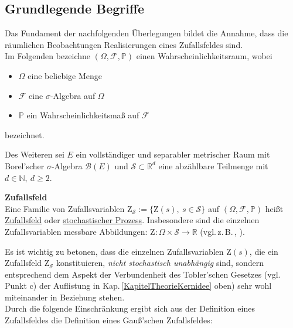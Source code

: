 \subsection{Grundlegende Begriffe}
\label{KapitelTheorieGrundlagen}
Das Fundament der nachfolgenden Überlegungen bildet die 
Annahme, dass die räumlichen Beobachtungen Realisierungen 
eines Zufallsfeldes sind.\\
Im Folgenden bezeichne $(\Omega, \mathcal{F}, \mathbb{P})$ einen Wahrscheinlichkeitsraum, wobei
\begin{itemize}[topsep=2pt,parsep=1pt,itemsep=0.5pt]
\item[$\circ$] $\Omega$ eine beliebige Menge 
\item[$\circ$] $\mathcal{F}$ eine $\sigma$-Algebra auf $\Omega$
\item[$\circ$] $\mathbb{P}$ ein Wahrscheinlichkeitsmaß 
auf $\mathcal{F}$
\end{itemize}
bezeichnet.

Des Weiteren sei $E$ ein vollständiger und separabler metrischer Raum
mit Borel'scher $\sigma$-Algebra $\mathcal{B}(E)$ und 
$\mathcal{S} \subset \mathbb{R}^d$ eine abzählbare Teilmenge 
mit $d \in\mathbb{N},\ d \geq 2$.

\begin{definition} \textbf{Zufallsfeld} \\
Eine Familie von Zufallsvariablen 
$\mathrm{Z}_\mathcal{S}:=\lbrace \mathrm{Z}(s),\ s \in \mathcal{S}\rbrace$
auf $(­\Omega, \mathcal{F},\mathbb{P})$ heißt
\underline{Zufallsfeld} oder \underline{stochastischer Prozess}.
Insbesondere sind die einzelnen Zufallsvariablen messbare Abbildungen:
$\mathrm{Z}: \Omega \times \mathcal{S} \longrightarrow \mathbb{R}$
(vgl.\,z.\,B.\,\cite[S.\,322]{Spodarev2015}, \cite[S.\,7]{Adler2007}).
\end{definition}  

Es ist wichtig zu betonen, dass die einzelnen Zufallsvariablen 
$\mathrm{Z}(s)$, die ein Zufallsfeld $\mathrm{Z}_\mathcal{S}$ konstituieren,
\textit{nicht stochastisch unabhängig} sind, sondern entsprechend dem
Aspekt der Verbundenheit des Tobler'schen Gesetzes (vgl.\,Punkt c) der
Auflistung in Kap.\,\ref{KapitelTheorieKernidee} oben) sehr wohl miteinander 
in Beziehung stehen.\\

Durch die folgende Einschränkung ergibt sich aus der Definition eines 
Zufallsfeldes die Definition eines Gauß'schen Zufallsfeldes:

